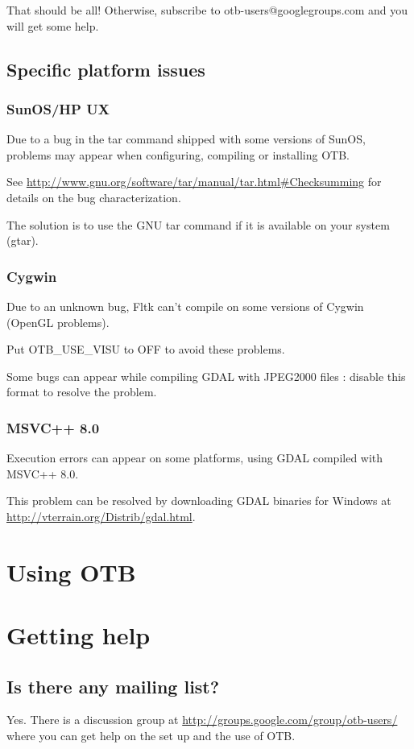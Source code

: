 That should be all! Otherwise, subscribe to
   otb-users@googlegroups.com and you will get some help.

\subsection{Specific platform issues}
\subsubsection{SunOS/HP UX}
Due to a bug in the tar command shipped with some versions of SunOS,
problems may appear when configuring, compiling or installing OTB.

See \url{http://www.gnu.org/software/tar/manual/tar.html#Checksumming} for
details on the bug characterization.

The solution is to use the GNU tar command if it is available on your
system (gtar).

\subsubsection{Cygwin}
Due to an unknown bug, Fltk can't compile on some versions of Cygwin (OpenGL problems).

Put OTB\_USE\_VISU to OFF to avoid these problems.

Some bugs can appear while compiling GDAL with JPEG2000 files : disable this format to resolve the problem.

\subsubsection{MSVC++ 8.0}
Execution errors can appear on some platforms, using GDAL compiled with MSVC++ 8.0.

This problem can be resolved by downloading GDAL binaries for Windows
at \url{http://vterrain.org/Distrib/gdal.html}.

\section{Using OTB}

\section{Getting help}
\subsection{Is there any mailing list?}
Yes. There is a discussion group at
\url{http://groups.google.com/group/otb-users/} where you can get help
on the set up and the use of OTB.

